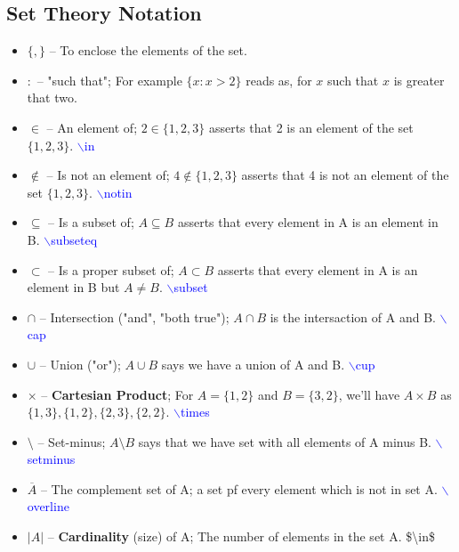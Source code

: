 \documentclass[12pt]{article}
\begin{document}
\subsection*{Set Theory Notation}
\begin{itemize}
    \item $\{,\}$ -- To enclose the elements of the set.
    \item $:$ -- "such that"; For example $\{x: x > 2\}$ reads as, for $x$ such that $x$ is greater that two.
    \item $\in$ -- An element of; $2 \in \{1,2,3\}$ asserts that 2 is an element of the set $\{1,2,3\}$. \textcolor{blue} {$\backslash$in}
    \item $\notin$ -- Is not an element of; $4 \notin \{1,2,3\}$ asserts that 4 is not an element of the set $\{1,2,3\}$. \textcolor{blue} {$\backslash$notin}
    \item $\subseteq$ -- Is a subset of; $A\subseteq B$ asserts that every element in A is an element in B. \textcolor{blue} {$\backslash$subseteq}
    \item $\subset$ -- Is a proper subset of; $A\subset B$ asserts that every element in A is an element in B but $A\neq B$. \textcolor{blue} {$\backslash$subset}
    \item $\cap$ -- Intersection ("and", "both true"); $A\cap B$ is the intersaction of A and B. \textcolor{blue} {$\backslash$cap}
    \item $\cup$ -- Union ("or"); $A\cup B$ says we have a union of A and B. \textcolor{blue} {$\backslash$cup}
    \item $\times$ -- \textbf{Cartesian Product}; For $A=\{1,2\}$ and $B=\{3,2\}$, we'll have $A\times B$ as $\{1,3\}, \{1,2\}, \{2,3\}, \{2,2\}$. \textcolor{blue} {$\backslash$times}
    \item $\setminus$ -- Set-minus; $A\setminus B$ says that we have set with all elements of A minus B. \textcolor{blue} {$\backslash$setminus}
    \item $\overline{A}$ -- The complement set of A; a set pf every element which is not in set A. \textcolor{blue} {$\backslash$overline}
    \item $|A|$ -- \textbf{Cardinality} (size) of A; The number of elements in the set A. \$\textbackslash in\$
\end{itemize}
\end{document}
